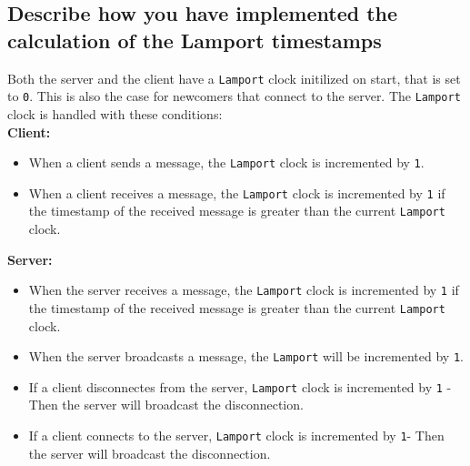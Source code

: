 \documentclass[a4paper,11pt]{article}
\begin{document}
\subsection*{Describe how you have implemented the calculation of the Lamport timestamps}
Both the server and the client have a \verb|Lamport| clock initilized on start, that is set to \verb|0|. This is also the case for newcomers that connect to the server. 
The \verb|Lamport| clock is handled with these conditions:\\
\textbf{Client:}
\begin{itemize}
    \item When a client sends a message, the \verb|Lamport| clock is incremented by \verb|1|.
    \item When a client receives a message, the \verb|Lamport| clock is incremented by \verb|1| if the timestamp of the received message is greater than the current \verb|Lamport| clock.
\end{itemize}
\textbf{Server:}
\begin{itemize}
    \item When the server receives a message, the \verb|Lamport| clock is incremented by \verb|1| if the timestamp of the received message is greater than the current \verb|Lamport| clock.
    \item When the server broadcasts a message, the \verb|Lamport| will be incremented by \verb|1|.
    \item If a client disconnectes from the server, \verb|Lamport| clock is incremented by \verb|1| - Then the server will broadcast the disconnection.
    \item If a client connects to the server, \verb|Lamport| clock is incremented by \verb|1|- Then the server will broadcast the disconnection.
\end{itemize}
\end{document}
